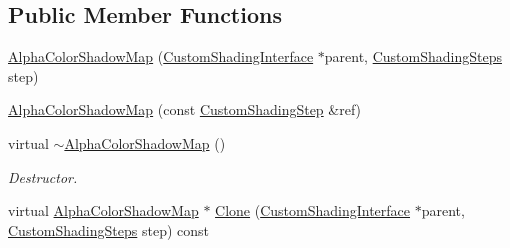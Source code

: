 \subsection*{Public Member Functions}
\begin{DoxyCompactItemize}
\item 
\mbox{\hyperlink{class_geometry_engine_1_1_custom_shading_1_1_alpha_color_shadow_map_ab094e1fb0b3b299584d7f0ab1fc5b924}{Alpha\+Color\+Shadow\+Map}} (\mbox{\hyperlink{class_geometry_engine_1_1_custom_shading_1_1_custom_shading_interface}{Custom\+Shading\+Interface}} $\ast$parent, \mbox{\hyperlink{namespace_geometry_engine_1_1_custom_shading_a2dc236a5b567da5099069ce2b2be5609}{Custom\+Shading\+Steps}} step)
\item 
\mbox{\hyperlink{class_geometry_engine_1_1_custom_shading_1_1_alpha_color_shadow_map_af642d840c7cb815b5f33aca8b25a82c1}{Alpha\+Color\+Shadow\+Map}} (const \mbox{\hyperlink{class_geometry_engine_1_1_custom_shading_1_1_custom_shading_step}{Custom\+Shading\+Step}} \&ref)
\item 
\mbox{\label{class_geometry_engine_1_1_custom_shading_1_1_alpha_color_shadow_map_af85a4b3ef41d5d4efeb4b64ea3ed2525}} 
virtual \mbox{\hyperlink{class_geometry_engine_1_1_custom_shading_1_1_alpha_color_shadow_map_af85a4b3ef41d5d4efeb4b64ea3ed2525}{$\sim$\+Alpha\+Color\+Shadow\+Map}} ()
\begin{DoxyCompactList}\small\item\em Destructor. \end{DoxyCompactList}\item 
virtual \mbox{\hyperlink{class_geometry_engine_1_1_custom_shading_1_1_alpha_color_shadow_map}{Alpha\+Color\+Shadow\+Map}} $\ast$ \mbox{\hyperlink{class_geometry_engine_1_1_custom_shading_1_1_alpha_color_shadow_map_a9c9a47e7868b8ef033626de0994a1733}{Clone}} (\mbox{\hyperlink{class_geometry_engine_1_1_custom_shading_1_1_custom_shading_interface}{Custom\+Shading\+Interface}} $\ast$parent, \mbox{\hyperlink{namespace_geometry_engine_1_1_custom_shading_a2dc236a5b567da5099069ce2b2be5609}{Custom\+Shading\+Steps}} step) const
\end{DoxyCompactItemize}
